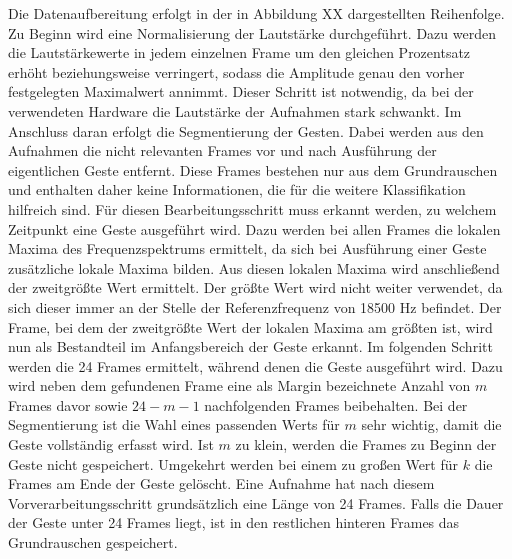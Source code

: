 Die Datenaufbereitung erfolgt in der in Abbildung XX dargestellten Reihenfolge. 
Zu Beginn wird eine Normalisierung der 
Lautstärke durchgeführt. Dazu werden die Lautstärkewerte in jedem einzelnen Frame um den gleichen Prozentsatz erhöht beziehungsweise verringert, sodass die Amplitude genau den vorher festgelegten Maximalwert annimmt. Dieser Schritt ist notwendig, da bei der verwendeten Hardware die Lautstärke der Aufnahmen stark schwankt.
Im Anschluss daran erfolgt die Segmentierung der Gesten. Dabei werden aus den Aufnahmen die nicht relevanten Frames vor und nach Ausführung der eigentlichen Geste entfernt. Diese Frames bestehen nur aus dem Grundrauschen und enthalten daher keine Informationen, die für die weitere Klassifikation hilfreich sind.
Für diesen Bearbeitungsschritt muss erkannt werden, zu welchem Zeitpunkt eine Geste ausgeführt wird. Dazu werden bei allen Frames die lokalen Maxima des Frequenzspektrums ermittelt, da sich bei Ausführung einer Geste zusätzliche lokale Maxima bilden.
Aus diesen lokalen Maxima wird anschließend der zweitgrößte Wert ermittelt. Der größte Wert wird nicht weiter verwendet, da sich dieser immer an der Stelle der Referenzfrequenz von 18500 Hz befindet. 
Der Frame, bei dem der zweitgrößte Wert der lokalen Maxima am größten ist, wird nun als Bestandteil im Anfangsbereich der Geste erkannt. 
Im folgenden Schritt werden die 24 Frames ermittelt, während denen die Geste ausgeführt wird. 
Dazu wird neben dem gefundenen Frame eine als Margin bezeichnete Anzahl von $m$ Frames davor sowie $24-m-1$ nachfolgenden Frames beibehalten. Bei der Segmentierung ist die Wahl eines passenden Werts für $m$ sehr wichtig, damit die Geste vollständig erfasst wird. Ist $m$ zu klein, werden die Frames zu Beginn der Geste nicht gespeichert. Umgekehrt werden bei einem zu großen Wert für $k$ die Frames am Ende der Geste gelöscht. Eine Aufnahme hat nach diesem Vorverarbeitungsschritt grundsätzlich eine Länge von 24 Frames. Falls die Dauer der Geste unter 24 Frames liegt, ist in den restlichen hinteren Frames das Grundrauschen gespeichert.

